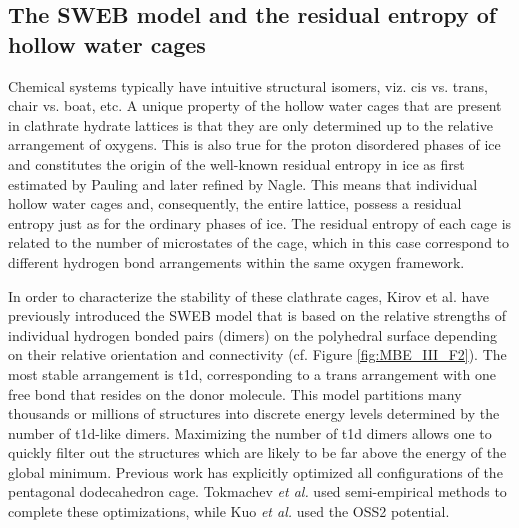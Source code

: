 \documentclass[11pt, proquest]{uwthesis}[2020/02/24]
\let\ce\ch
\begin{document}
\subsection{The SWEB model and the residual entropy of hollow water cages}

\par Chemical systems typically have intuitive structural isomers, viz. cis vs. trans, chair vs. boat, etc. A unique property of the hollow water cages that are present in clathrate hydrate lattices is that they are only determined up to the relative arrangement of oxygens. This is also true for the proton disordered phases of ice and constitutes the origin of the well-known residual entropy in ice as first estimated by Pauling\autocite{pauling_structure_1935} and later refined by Nagle.\autocite{nagle_lattice_1966} This means that individual hollow water cages and, consequently, the entire lattice, possess a residual entropy just as for the ordinary phases of ice. The residual entropy of each cage is related to the number of microstates of the cage, which in this case correspond to different hydrogen bond arrangements within the same oxygen framework.

\par In order to characterize the stability of these clathrate cages, Kirov et al. have previously introduced the SWEB model that is based on the relative strengths of individual hydrogen bonded pairs (dimers) on the polyhedral surface depending on their relative orientation and connectivity (cf. Figure \ref{fig:MBE_III_F2}).\autocite{kirov_identifying_2008} The most stable arrangement is t1d, corresponding to a trans arrangement with one free \ce{OH} bond that resides on the donor molecule. This model partitions many thousands or millions of structures into discrete energy levels determined by the number of t1d-like dimers. Maximizing the number of t1d dimers allows one to quickly filter out the structures which are likely to be far above the energy of the global minimum. Previous work has explicitly optimized all configurations of the pentagonal dodecahedron \ce{(H2O)_{20}} cage. Tokmachev \textit{et al.}\autocite{tokmachev_hydrogen-bond_2010} used semi-empirical methods  to complete these optimizations, while Kuo \textit{et al.} used the OSS2 potential.\autocite{kuo_use_2001}


\end{document}
